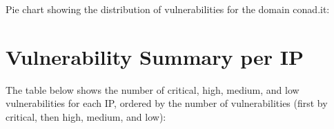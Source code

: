 \documentclass{article}
\begin{document}
\noindent Pie chart showing the distribution of vulnerabilities for the domain \ttfamily conad.it:


\begin{figure}[H]
    \centering
\end{figure}


\clearpage

\section{Vulnerability Summary per IP}

\noindent The table below shows the number of critical, high, medium, and low vulnerabilities for each IP, ordered by the number of vulnerabilities (first by critical, then high, medium, and low):
\end{document}
